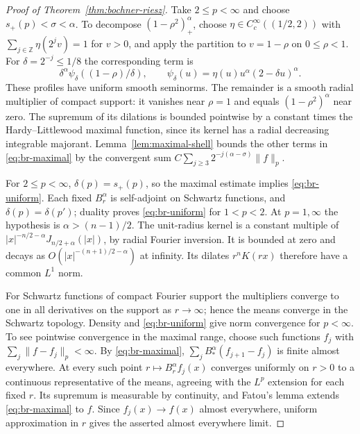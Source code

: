 \begin{proof}[Proof of Theorem~\ref{thm:bochner-riesz}]
Take \(2\le p<\infty\) and choose \(s_+(p)<\sigma<\alpha\).
To decompose \((1-\rho^2)_+^\alpha\), choose
\(\eta\in C_c^\infty((1/2,2))\) with
\(\sum_{j\in\mathbb Z}\eta(2^j v)=1\) for \(v>0\), and apply the
partition to \(v=1-\rho\) on \(0\le\rho<1\). For
\(\delta=2^{-j}\le1/8\) the corresponding term is
\[
 \delta^\alpha\psi_\delta((1-\rho)/\delta),
 \qquad
 \psi_\delta(u)=\eta(u)u^\alpha(2-\delta u)^\alpha .
\]
These profiles have uniform smooth seminorms. The remainder is a smooth
radial multiplier of compact support: it vanishes near \(\rho=1\) and
equals \((1-\rho^2)^\alpha\) near zero. The supremum of its dilations is
bounded pointwise by a constant times the Hardy--Littlewood maximal
function, since its kernel has a radial decreasing integrable majorant.
Lemma~\ref{lem:maximal-shell} bounds the other terms in \eqref{eq:br-maximal}
by the convergent sum \(C\sum_{j\ge3}2^{-j(\alpha-\sigma)}\|f\|_p\).

For \(2\le p<\infty\), \(\delta(p)=s_+(p)\), so the maximal estimate
implies \eqref{eq:br-uniform}. Each fixed \(B_r^\alpha\) is self-adjoint
on Schwartz functions, and \(\delta(p)=\delta(p')\); duality proves
\eqref{eq:br-uniform} for \(1<p<2\). At \(p=1,\infty\) the hypothesis is
\(\alpha>(n-1)/2\). The unit-radius kernel is a constant multiple of
\(|x|^{-n/2-\alpha}J_{n/2+\alpha}(|x|)\), by radial Fourier inversion.
It is bounded at zero and decays as \(O(|x|^{-(n+1)/2-\alpha})\) at
infinity. Its dilates \(r^n K(rx)\) therefore have a common \(L^1\) norm.

For Schwartz functions of compact Fourier support the multipliers converge
to one in all derivatives on the support as \(r\to\infty\); hence the means
converge in the Schwartz topology. Density and \eqref{eq:br-uniform} give
norm convergence for \(p<\infty\). To see pointwise convergence in the
maximal range, choose such functions \(f_j\) with
\(\sum_j\|f-f_j\|_p<\infty\). By \eqref{eq:br-maximal},
\(\sum_j B_*^\alpha(f_{j+1}-f_j)\) is finite almost everywhere. At every
such point \(r\mapsto B_r^\alpha f_j(x)\) converges uniformly on \(r>0\)
to a continuous representative of the means, agreeing with the \(L^p\)
extension for each fixed \(r\). Its supremum is measurable by continuity,
and Fatou's lemma extends \eqref{eq:br-maximal} to \(f\).
Since \(f_j(x)\to f(x)\) almost everywhere, uniform approximation in
\(r\) gives the asserted almost everywhere limit.
\end{proof}
